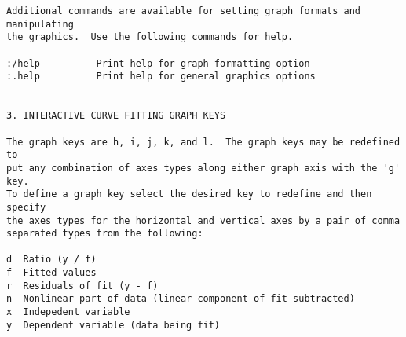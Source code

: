 \begin{verbatim}
Additional commands are available for setting graph formats and manipulating
the graphics.  Use the following commands for help.

:/help			Print help for graph formatting option
:.help			Print help for general graphics options


3. INTERACTIVE CURVE FITTING GRAPH KEYS

The graph keys are h, i, j, k, and l.  The graph keys may be redefined to
put any combination of axes types along either graph axis with the 'g' key.
To define a graph key select the desired key to redefine and then specify
the axes types for the horizontal and vertical axes by a pair of comma
separated types from the following:

d  Ratio (y / f)
f  Fitted values
r  Residuals of fit (y - f)
n  Nonlinear part of data (linear component of fit subtracted)
x  Indepedent variable
y  Dependent variable (data being fit)
\end{verbatim}
\endgroup
